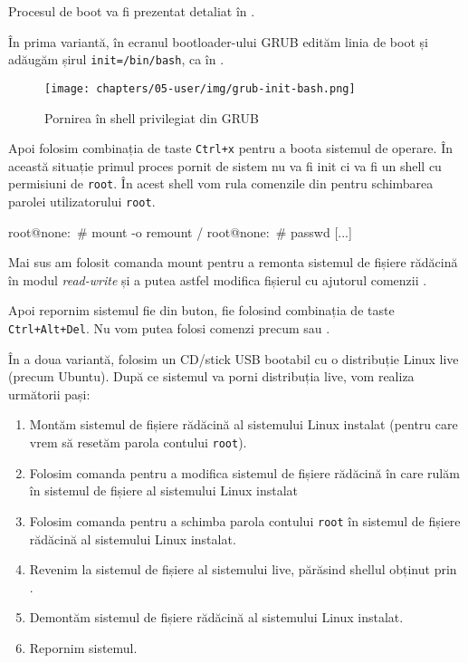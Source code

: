 Procesul de boot va fi prezentat detaliat în .

În prima variantă, în ecranul bootloader-ului GRUB  edităm linia de boot și adăugăm șirul \texttt{init=/bin/bash}, ca în .

\begin{figure}[!htbp]
  \centering
  \texttt{[image: chapters/05-user/img/grub-init-bash.png]}
  \caption{Pornirea în shell privilegiat din GRUB}
  \label{fig:user:grub-init-bash}
\end{figure}

Apoi folosim combinația de taste \texttt{Ctrl+x} pentru a boota sistemul de operare.
În această situație primul proces pornit de sistem nu va fi init ci va fi un shell cu permisiuni de \texttt{root}.
În acest shell vom rula comenzile din  pentru schimbarea parolei utilizatorului \texttt{root}.

\begin{screen}[caption={Schimbarea parolei contului root în shellul privilegiat},label={lst:user:change-root-pw}]
root@none:~# mount -o remount /
root@none:~# passwd
[...]
\end{screen}

Mai sus am folosit comanda mount pentru a remonta sistemul de fișiere rădăcină în modul \textit{read-write} și a putea astfel modifica fișierul  cu ajutorul comenzii .

Apoi repornim sistemul fie din buton, fie folosind combinația de taste \texttt{Ctrl+Alt+Del}.
Nu vom putea folosi comenzi precum  sau .

În a doua variantă, folosim un CD/stick USB bootabil cu o distribuție Linux live (precum Ubuntu).
După ce sistemul va porni distribuția live, vom realiza următorii pași:

\begin{enumerate}
  \item Montăm sistemul de fișiere rădăcină al sistemului Linux instalat (pentru care vrem să resetăm parola contului \texttt{root}).
  \item Folosim comanda  pentru a modifica sistemul de fișiere rădăcină în care rulăm în sistemul de fișiere al sistemului Linux instalat
  \item Folosim comanda  pentru a schimba parola contului \texttt{root} în sistemul de fișiere rădăcină al sistemului Linux instalat.
  \item Revenim la sistemul de fișiere al sistemului live, părăsind shellul obținut prin .
  \item Demontăm sistemul de fișiere rădăcină al sistemului Linux instalat.
  \item Repornim sistemul.
\end{enumerate}

